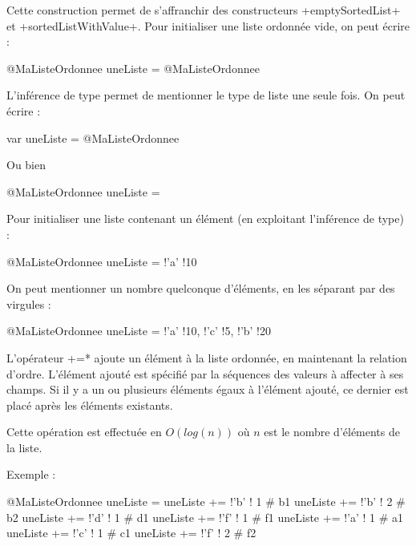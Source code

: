 
Cette construction permet de s'affranchir des constructeurs \ggst+emptySortedList+ et \ggst+sortedListWithValue+. Pour initialiser une liste ordonnée vide, on peut écrire :

\begin{galgas3}
@MaListeOrdonnee uneListe = @MaListeOrdonnee {}
\end{galgas3}

L'inférence de type permet de mentionner le type de liste une seule fois. On peut écrire :
\begin{galgas3}
var uneListe = @MaListeOrdonnee {}
\end{galgas3}

Ou bien
\begin{galgas3}
@MaListeOrdonnee uneListe = {}
\end{galgas3}


Pour initialiser une liste contenant un élément (en exploitant l'inférence de type) :
\begin{galgas3}
@MaListeOrdonnee uneListe = {!'a' !10}
\end{galgas3}

On peut mentionner un nombre quelconque d'éléments, en les séparant par des virgules :
\begin{galgas3}
@MaListeOrdonnee uneListe = {!'a' !10, !'c' !5, !'b' !20}
\end{galgas3}





L'opérateur \ggst*+=* ajoute un élément à la liste ordonnée, en maintenant la relation d'ordre. L'élément ajouté est spécifié par la séquences des valeurs à affecter à ses champs. Si il y a un ou plusieurs éléments égaux à l'élément ajouté, ce dernier est placé après les éléments existants.


Cette opération est effectuée en $O(log (n))$ où $n$ est le nombre d'éléments de la liste.

Exemple :

\begin{galgas3}
@MaListeOrdonnee uneListe = {}
uneListe += !'b' ! 1 # b1
uneListe += !'b' ! 2 # b2
uneListe += !'d' ! 1 # d1
uneListe += !'f' ! 1 # f1
uneListe += !'a' ! 1 # a1
uneListe += !'c' ! 1 # c1
uneListe += !'f' ! 2 # f2
\end{galgas3}


